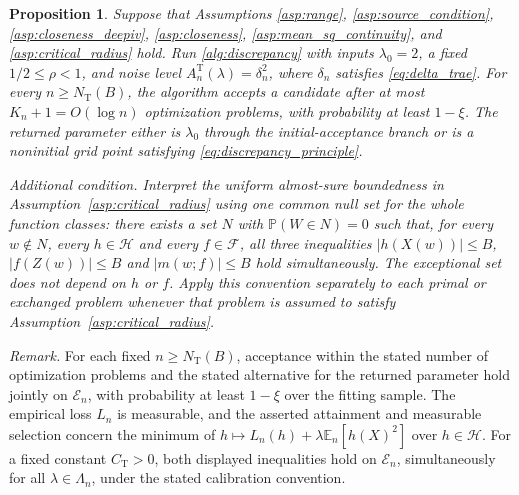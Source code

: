 \documentclass[12pt]{article}
\theoremstyle{plain}
\newtheorem{proposition}[theorem]{Proposition}
\theoremstyle{definition}
\theoremstyle{remark}
\begin{document}
\begin{proposition}\label{prop:exist_lambda}
    Suppose that Assumptions \ref{asp:range}, \ref{asp:source_condition},
    \ref{asp:closeness_deepiv}, \ref{asp:closeness},
    \ref{asp:mean_sq_continuity}, and \ref{asp:critical_radius} hold.
    Run \cref{alg:discrepancy} with inputs $\lambda_0 = 2$, a fixed $1/2\leqslant\rho<1$, and
    noise level $A_n^{\mathrm T}(\lambda)=\delta^2_n$, where $\delta_n$ satisfies \eqref{eq:delta_trae}.
    For every $n\geqslant N_{\mathrm T}(B)$, the algorithm accepts a candidate after at most $K_n+1=O(\log n)$
    optimization problems, with probability at least $1-\xi$.
    The returned parameter either is $\lambda_0$ through the initial-acceptance
    branch or is a noninitial grid point satisfying
    \eqref{eq:discrepancy_principle}.

\emph{Additional condition.} Interpret the uniform almost-sure boundedness in Assumption~\ref{asp:critical_radius} using one common null set for the whole function classes: there exists a set $N$ with $\mathbb P(W\in N)=0$ such that, for every $w\notin N$, every $h\in\mathcal H$ and every $f\in\mathcal F$, all three inequalities $|h(X(w))|\leqslant B$, $|f(Z(w))|\leqslant B$ and $|m(w;f)|\leqslant B$ hold simultaneously. The exceptional set does not depend on $h$ or $f$. Apply this convention separately to each primal or exchanged problem whenever that problem is assumed to satisfy Assumption~\ref{asp:critical_radius}.
\end{proposition}

\noindent\textit{Remark.} For each fixed $n\geqslant N_{\mathrm T}(B)$, acceptance within the stated number of optimization problems and the stated alternative for the returned parameter hold jointly on $\mathcal E_n$, with probability at least $1-\xi$ over the fitting sample. The empirical loss $L_n$ is measurable, and the asserted attainment and measurable selection concern the minimum of $h\mapsto L_n(h)+\lambda\mathbb E_n[h(X)^2]$ over $h\in\mathcal H$. For a fixed constant $C_{\mathrm T}>0$, both displayed inequalities hold on $\mathcal E_n$, simultaneously for all $\lambda\in\Lambda_n$, under the stated calibration convention.
\end{document}
